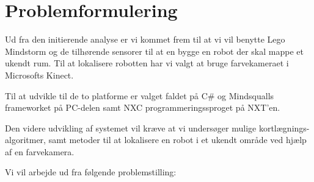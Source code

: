 \section{Problemformulering}

Ud fra den initierende analyse er vi kommet frem til at vi vil benytte Lego Mindstorm og de tilhørende sensorer til at en bygge en robot der skal mappe et ukendt rum.
Til at lokalisere robotten har vi valgt at bruge farvekameraet i Microsofts Kinect.

Til at udvikle til de to platforme er valget faldet på C\# og Mindsqualls frameworket på PC-delen samt NXC programmeringssproget på NXT'en.

Den videre udvikling af systemet vil kræve at vi undersøger mulige kortlægnings-algoritmer, samt metoder til at lokalisere en robot i et ukendt område ved hjælp af en farvekamera.

Vi vil arbejde ud fra følgende problemstilling:

